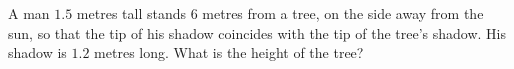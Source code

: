 A man $1.5$ metres tall stands $6$ metres from a tree, on the side away from the sun, so that the tip of his shadow coincides with the tip of the tree's shadow. His shadow is $1.2$ metres long. What is the height of the tree?
